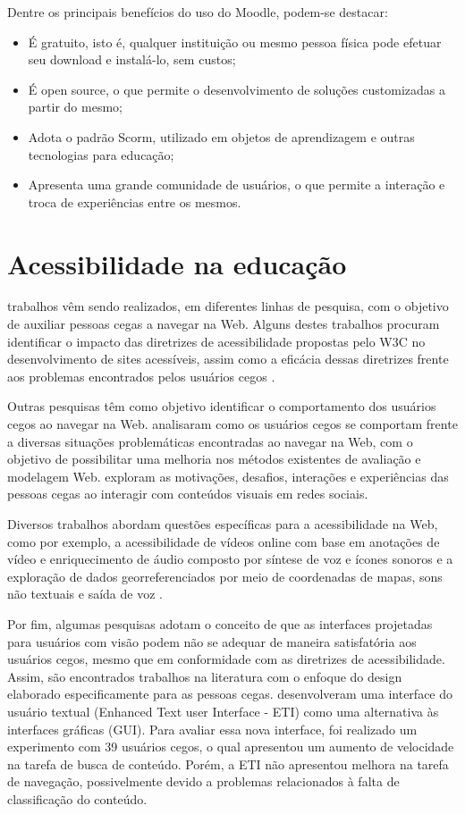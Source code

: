 \documentclass[12pt,journal,compsoc]{IEEEtran}
\begin{document}
Dentre os principais benefícios do uso do Moodle, podem-se destacar:
\begin{itemize}
  \item{É gratuito, isto é, qualquer instituição ou mesmo pessoa física pode efetuar seu download e instalá-lo, sem custos;}
  \item{É open source, o que permite o desenvolvimento de soluções customizadas a partir do mesmo;}
  \item{Adota o padrão Scorm, utilizado em objetos de aprendizagem e outras tecnologias para educação;}
  \item{Apresenta uma grande comunidade de usuários, o que permite a interação e troca de experiências entre os mesmos.}
\end{itemize}

\section{Acessibilidade na educação}
 trabalhos vêm sendo realizados, em diferentes linhas de pesquisa, com o objetivo de auxiliar pessoas cegas a 
navegar na Web. Alguns destes trabalhos procuram identificar o impacto das diretrizes de acessibilidade propostas pelo 
W3C no desenvolvimento de sites acessíveis, assim como a eficácia dessas diretrizes frente aos problemas encontrados 
pelos usuários cegos \cite{4ce5a8d646ac449e98d079b8f6c3a7c5} \cite{Power2012}.

Outras pesquisas têm como objetivo identificar o comportamento dos usuários cegos ao navegar na Web. 
\cite{Vigo2013} analisaram como os usuários cegos se comportam frente a diversas situações problemáticas 
encontradas ao navegar na Web, com o objetivo de possibilitar uma melhoria nos métodos existentes de avaliação 
e modelagem Web. \cite{Voykinska2016} exploram as motivações, desafios, interações e experiências das 
pessoas cegas ao interagir com conteúdos visuais em redes sociais.

Diversos trabalhos abordam questões específicas para a acessibilidade na Web, como por exemplo, 
a acessibilidade de vídeos online com base em anotações de vídeo e enriquecimento de áudio composto por 
síntese de voz e ícones sonoros \cite{Encelle2011} e a exploração de dados georreferenciados 
por meio de coordenadas de mapas, sons não textuais e saída de voz \cite{Zhao2008}.

Por fim, algumas pesquisas adotam o conceito de que as interfaces projetadas para usuários com 
visão podem não se adequar de maneira satisfatória aos usuários cegos, mesmo que em conformidade 
com as diretrizes de acessibilidade. Assim, são encontrados trabalhos na literatura com o enfoque 
do design elaborado especificamente para as pessoas cegas. \cite{Press2008} desenvolveram uma 
interface do usuário textual (Enhanced Text user Interface - ETI) como uma alternativa 
às interfaces gráficas (GUI). Para avaliar essa nova interface, foi realizado um experimento com 39 
usuários cegos, o qual apresentou um aumento de velocidade na tarefa de busca de conteúdo. Porém, a 
ETI não apresentou melhora na tarefa de navegação, possivelmente devido a problemas relacionados à 
falta de classificação do conteúdo.
\end{document}
